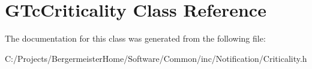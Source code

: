 \hypertarget{class_g_tc_criticality}{}\section{G\+Tc\+Criticality Class Reference}
\label{class_g_tc_criticality}


The documentation for this class was generated from the following file\+:\begin{DoxyCompactItemize}
\item 
C\+:/\+Projects/\+Bergermeister\+Home/\+Software/\+Common/inc/\+Notification/Criticality.\+h\end{DoxyCompactItemize}
